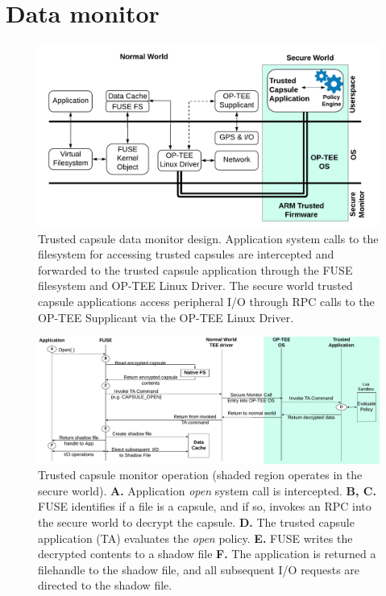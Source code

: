 \section{Data monitor}
\label{subsec:data_monitor}
\begin{figure}
    \centering
    \includegraphics[width=\columnwidth]{fig/Fig3_TC_data_monitor_system_cache.pdf}
    \caption{Trusted capsule data monitor design. Application system calls to the filesystem for accessing trusted capsules are intercepted and forwarded to the trusted capsule application through the FUSE filesystem and OP-TEE Linux Driver.
        The secure world trusted capsule applications access peripheral I/O through RPC calls to the OP-TEE Supplicant via the OP-TEE Linux Driver.}
    \label{fig:SystemModel}
\end{figure}

\begin{figure}
    \centering
    \includegraphics[width=\textwidth]{fig/TC_open_operation.pdf}
    \caption{Trusted capsule monitor operation (shaded region operates in the secure world).
        \textbf{A.} Application \textit{open} system call is intercepted.
        \textbf{B, C.} FUSE identifies if a file is a capsule, and if so, invokes an RPC into the secure world to decrypt the capsule.
        \textbf{D.} The trusted capsule application (TA) evaluates the \textit{open} policy.
        \textbf{E.} FUSE writes the decrypted contents to a shadow file
        \textbf{F.} The application is returned a filehandle to the shadow file, and all subsequent I/O requests are directed to the shadow file.
    }
    \label{fig:FlowChart}
\end{figure}

